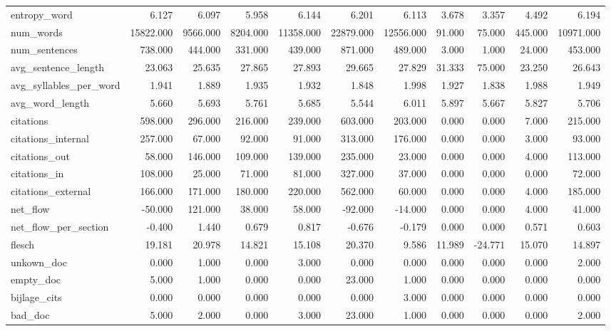 \begin{tabular}{lrrrrrrrrrr}
\cline{1-11}
entropy\_word & 6.127 & 6.097 & 5.958 & 6.144 & 6.201 & 6.113 & 3.678 & 3.357 & 4.492 & 6.194 \\
\cline{1-11}
num\_words & 15822.000 & 9566.000 & 8204.000 & 11358.000 & 22879.000 & 12556.000 & 91.000 & 75.000 & 445.000 & 10971.000 \\
\cline{1-11}
num\_sentences & 738.000 & 444.000 & 331.000 & 439.000 & 871.000 & 489.000 & 3.000 & 1.000 & 24.000 & 453.000 \\
\cline{1-11}
avg\_sentence\_length & 23.063 & 25.635 & 27.865 & 27.893 & 29.665 & 27.829 & 31.333 & 75.000 & 23.250 & 26.643 \\
\cline{1-11}
avg\_syllables\_per\_word & 1.941 & 1.889 & 1.935 & 1.932 & 1.848 & 1.998 & 1.927 & 1.838 & 1.988 & 1.949 \\
\cline{1-11}
avg\_word\_length & 5.660 & 5.693 & 5.761 & 5.685 & 5.544 & 6.011 & 5.897 & 5.667 & 5.827 & 5.706 \\
\cline{1-11}
citations & 598.000 & 296.000 & 216.000 & 239.000 & 603.000 & 203.000 & 0.000 & 0.000 & 7.000 & 215.000 \\
\cline{1-11}
citations\_internal & 257.000 & 67.000 & 92.000 & 91.000 & 313.000 & 176.000 & 0.000 & 0.000 & 3.000 & 93.000 \\
\cline{1-11}
citations\_out & 58.000 & 146.000 & 109.000 & 139.000 & 235.000 & 23.000 & 0.000 & 0.000 & 4.000 & 113.000 \\
\cline{1-11}
citations\_in & 108.000 & 25.000 & 71.000 & 81.000 & 327.000 & 37.000 & 0.000 & 0.000 & 0.000 & 72.000 \\
\cline{1-11}
citations\_external & 166.000 & 171.000 & 180.000 & 220.000 & 562.000 & 60.000 & 0.000 & 0.000 & 4.000 & 185.000 \\
\cline{1-11}
net\_flow & -50.000 & 121.000 & 38.000 & 58.000 & -92.000 & -14.000 & 0.000 & 0.000 & 4.000 & 41.000 \\
\cline{1-11}
net\_flow\_per\_section & -0.400 & 1.440 & 0.679 & 0.817 & -0.676 & -0.179 & 0.000 & 0.000 & 0.571 & 0.603 \\
\cline{1-11}
flesch & 19.181 & 20.978 & 14.821 & 15.108 & 20.370 & 9.586 & 11.989 & -24.771 & 15.070 & 14.897 \\
\cline{1-11}
unkown\_doc & 0.000 & 1.000 & 0.000 & 3.000 & 0.000 & 0.000 & 0.000 & 0.000 & 0.000 & 2.000 \\
\cline{1-11}
empty\_doc & 5.000 & 1.000 & 0.000 & 0.000 & 23.000 & 1.000 & 0.000 & 0.000 & 0.000 & 0.000 \\
\cline{1-11}
bijlage\_cits & 0.000 & 0.000 & 0.000 & 0.000 & 0.000 & 3.000 & 0.000 & 0.000 & 0.000 & 0.000 \\
\cline{1-11}
bad\_doc & 5.000 & 2.000 & 0.000 & 3.000 & 23.000 & 1.000 & 0.000 & 0.000 & 0.000 & 2.000 \\
\cline{1-11}
\bottomrule
\end{tabular}
